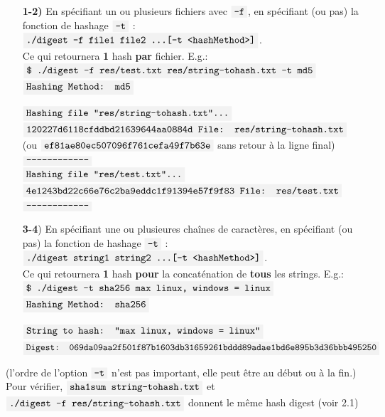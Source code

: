 \documentclass[french]{article}
\newcommand{\code}[1]{$\mbox{\colorbox{light-gray}{\texttt{#1}}}$}
\begin{document}
\begin{enumerate}
    \item[\textbf{1-2)}] En spécifiant un ou plusieurs fichiers avec \code{-f}, en spécifiant (ou pas) la fonction de hashage \code{-t} :\\ 
    \code{./digest -f file1 file2 \ldots [-t <hashMethod>]}.\\
    
    Ce qui retournera \textbf{1} hash \textbf{par} fichier. E.g.:\\
    \code{\$ ./digest -f res/test.txt res/string-tohash.txt -t md5}\\
    
    \code{Hashing Method: md5}
    
    \code{Hashing file "res/string-tohash.txt"\ldots}\\
    \code{120227d6118cfddbd21639644aa0884d File: res/string-tohash.txt}\\ 
    (ou \code{ef81ae80ec507096f761cefa49f7b63e} sans retour à la ligne final)\\
    \code{------------------------}\\
    
    \code{Hashing file "res/test.txt"\ldots}\\
    \code{4e1243bd22c66e76c2ba9eddc1f91394e57f9f83 File: res/test.txt}\\
    \code{------------------------}\\
    
    \item[\textbf{3-4})] En spécifiant une ou plusieures chaînes de caractères, en spécifiant (ou pas) la fonction de hashage \code{-t} :\\
    \code{./digest string1 string2 \ldots [-t <hashMethod>]}.\\
    
     Ce qui retournera \textbf{1} hash \textbf{pour} la concaténation de \textbf{tous} les strings. E.g.:\\
    
    \code{\$ ./digest -t sha256 max linux, windows = linux}\\
    
    \code{Hashing Method: sha256}
    
    \code{String to hash: "max linux, windows = linux"}\\
    \code{Digest: 069da09aa2f501f87b1603db31659261bddd89adae1bd6e895b3d36bbb495250}\\
    
\end{enumerate}

(l'ordre de l'option \code{-t} n'est pas important, elle peut être au début ou à la fin.)\\

Pour vérifier, \code{sha1sum string-tohash.txt} et \code{./digest -f res/string-tohash.txt} donnent le même hash digest (voir 2.1)
\end{document}
